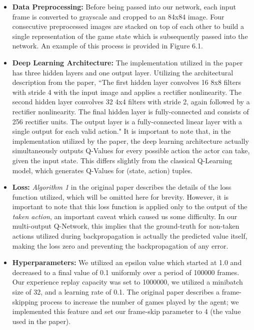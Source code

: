 \documentclass[paper=a4, fontsize=11pt]{scrartcl} %
\numberwithin{equation}{section} %
\numberwithin{figure}{section} %
\numberwithin{table}{section} %
\begin{document}
\begin{itemize}
\item \textbf{Data Preprocessing:} Before being passed into our network, each input frame is converted to grayscale and cropped to an 84x84 image. Four consecutive preprocessed images are stacked on top of each other to build a single representation of the game state which is subsequently passed into the network. An example of this process is provided in Figure 6.1.
\item \textbf{Deep Learning Architecture:} The implementation utilized in the paper has three hidden layers and one output layer. Utilizing the architectural description from the paper, ``The first hidden layer convolves 16 8x8 filters with stride 4 with the input image and applies a rectifier nonlinearity. The second hidden layer convolves 32 4x4 filters with stride 2, again followed by a rectifier nonlinearity. The final hidden layer is fully-connected and consists of 256 rectifier units. The output layer is a fully-connected linear layer with a single output for each valid action." It is important to note that, in the implementation utilized by the paper, the deep learning architecture actually simultaneously outputs Q-Values for every possible action the actor can take, given the input state. This differs slightly from the classical Q-Learning model, which generates Q-Values for (state, action) tuples.
\item \textbf{Loss:} \textit{Algorithm 1} in the original paper describes the details of the loss function utilized, which will be omitted here for brevity. However, it is important to note that this loss function is applied only to the output of the \textit{taken action}, an important caveat which caused us some difficulty. In our multi-output Q-Network, this implies that the ground-truth for non-taken actions utilized during backpropagation is actually the predicted value itself, making the loss zero and preventing the backpropagation of any error.
\item \textbf{Hyperparameters:} We utilized an epsilon value which started at 1.0 and decreased to a final value of 0.1 uniformly over a period of 100000 frames. Our experience replay capacity was set to 1000000, we utilized a minibatch size of 32, and a learning rate of 0.1. The original paper describes a frame-skipping process to increase the number of games played by the agent; we implemented this feature and set our frame-skip parameter to 4 (the value used in the paper).
\end{itemize}
\end{document}
